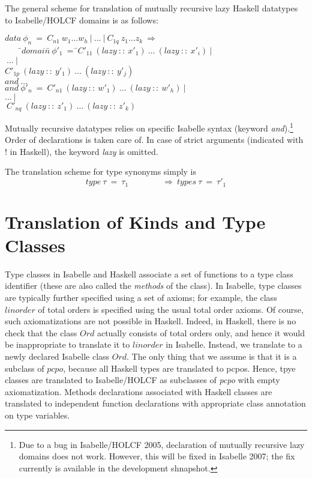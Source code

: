 \documentclass{llncs}
\begin{document}
The general scheme for translation of mutually recursive lazy Haskell
datatypes to Isabelle/HOLCF domains is as follows:
\begin{tabbing}
$ data \ \phi_n \ = \ C_{n1} \ w_1 \ldots w_h
  \ | \ \ldots \ | \ C_{1q} \ z_1 \ldots z_k \ \Longrightarrow $\\
$  \qquad $\=$ domain$\=$ \ \phi'_1 \ = \  $\=$ C'_{11} \ (lazy~ ::\ x'_1) \ \ldots \ (lazy~ :: \ 
  x'_i) \ |$\\
\>\>\>$ \ \ldots \ | \ $\\
\>\>\>$ C'_{1p} \ 
  (lazy~ :: \ y'_1) \ \ldots \ (lazy~ :: \ y'_j) $\\
\>$  and \ \ldots $\\
\>$  and \ $\>$\phi'_n \ = \ C'_{n1} \ (lazy~ :: \ w'_1) \ \ldots \ (lazy~ :: \ 
  w'_h) \ | \ $\\
\>\>\>$\ldots \ | $\\
\>\>\>$\  C'_{nq} \ 
  (lazy~ :: \ z'_1) \ \ldots \ (lazy~ :: \ z'_k) $\\
\end{tabbing}
Mutually recursive datatypes relies on specific Isabelle syntax
(keyword \emph{and}).\footnote {Due to a bug in Isabelle/HOLCF 2005,
  declaration of mutually recursive lazy domains does not work.
  However, this will be fixed in Isabelle 2007; the fix currently is
  available in the development shnapshot.} Order of declarations is
taken care of. In case of strict arguments (indicated with ! in
Haskell), the keyword \emph{lazy} is omitted.

The translation scheme for type synonyms simply is
$$  type \ \tau \ = \ \tau_1 \qquad \qquad \Longrightarrow
  \ types \ \tau \ = \ \tau'_1 
$$


\section{Translation of Kinds and Type Classes}

Type classes in Isabelle and Haskell associate a set of functions to a
type class identifier (these are also called the \emph{methods} of the
class). In Isabelle, type classes are typically further specified
using a set of axioms; for example, the class
$\mathit{linorder}$ of total orders is specified using the
usual total order axioms. Of course, such axiomatizations are not
possible in Haskell. Indeed, in Haskell, there is no check that the
class $Ord$ actually consists of total orders only, and hence it would
be inappropriate to translate it to $\mathit{linorder}$ in Isabelle.
Instead, we translate to a newly declared Isabelle class $Ord$.
The only thing that we assume is that it is a subclass of $pcpo$,
because all Haskell types are translated to pcpos.
Hence, tpye classes are translated to Isabelle/HOLCF as subclasses of
\emph{pcpo} with empty axiomatization.
Methods declarations associated with
Haskell classes are translated to independent function declarations with
appropriate class annotation on type variables. 
\end{document}
